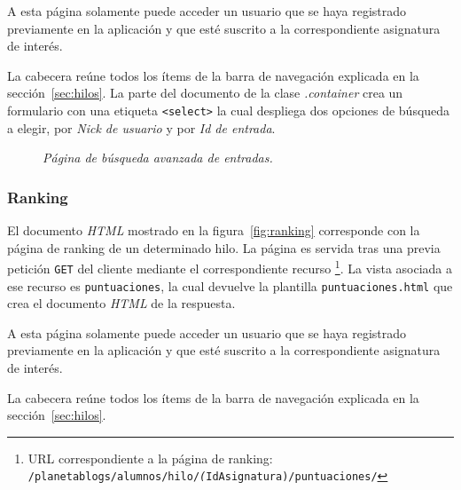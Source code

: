 \documentclass[a4paper, 12pt]{book}
\begin{document}
A esta p\'agina solamente puede acceder un usuario que se haya registrado previamente en la aplicaci\'on y que est\'e suscrito a la correspondiente 
asignatura de inter\'es.

La cabecera re\'une todos los \'items de la barra de navegaci\'on explicada en la secci\'on~\ref{sec:hilos}. La parte del documento de la clase 
\textit{.container} crea un formulario con una etiqueta \texttt{<select>} la cual despliega dos opciones de b\'usqueda a elegir, por \textit{Nick de usuario} 
y por \textit{Id de entrada}.
\begin{figure}
  \centering
  \caption{\textit{P\'agina de b\'usqueda avanzada de entradas.}}
  \label{fig:buscar}
\end{figure}


\subsubsection{Ranking} 
\label{sec:ranking}
El documento \textit{HTML} mostrado en la figura~\ref{fig:ranking} corresponde con la p\'agina de ranking de un determinado hilo. 
La p\'agina es servida tras una previa petici\'on \texttt{GET} del cliente mediante el correspondiente recurso \footnote{URL correspondiente a la p\'agina de 
ranking: \texttt{/planetablogs/alumnos/hilo/\textit(IdAsignatura)/puntuaciones/}}. La vista asociada a ese recurso es \texttt{puntuaciones}, la cual 
devuelve la plantilla \texttt{puntuaciones.html} que crea el documento \textit{HTML} de la respuesta.

A esta p\'agina solamente puede acceder un usuario que se haya registrado previamente en la aplicaci\'on y que est\'e suscrito a la
correspondiente asignatura de inter\'es.

La cabecera re\'une todos los \'items de la barra de navegaci\'on explicada en la secci\'on~\ref{sec:hilos}. 
\end{document}
